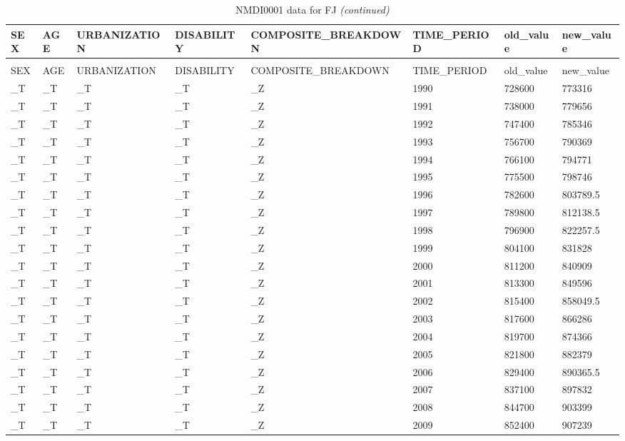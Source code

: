 
\begin{longtable}[t]{llllllll}
\caption{NMDI0001 data for FJ}\\
\toprule
SEX & AGE & URBANIZATION & DISABILITY & COMPOSITE\_BREAKDOWN & TIME\_PERIOD & old\_value & new\_value\\
\midrule
\endfirsthead
\caption[]{NMDI0001 data for FJ \textit{(continued)}}\\
\toprule
SEX & AGE & URBANIZATION & DISABILITY & COMPOSITE\_BREAKDOWN & TIME\_PERIOD & old\_value & new\_value\\
\midrule
\endhead

\endfoot
\bottomrule
\endlastfoot
\_T & \_T & \_T & \_T & \_Z & 1990 & 728600 & 773316\\
\_T & \_T & \_T & \_T & \_Z & 1991 & 738000 & 779656\\
\_T & \_T & \_T & \_T & \_Z & 1992 & 747400 & 785346\\
\_T & \_T & \_T & \_T & \_Z & 1993 & 756700 & 790369\\
\_T & \_T & \_T & \_T & \_Z & 1994 & 766100 & 794771\\
\addlinespace
\_T & \_T & \_T & \_T & \_Z & 1995 & 775500 & 798746\\
\_T & \_T & \_T & \_T & \_Z & 1996 & 782600 & 803789.5\\
\_T & \_T & \_T & \_T & \_Z & 1997 & 789800 & 812138.5\\
\_T & \_T & \_T & \_T & \_Z & 1998 & 796900 & 822257.5\\
\_T & \_T & \_T & \_T & \_Z & 1999 & 804100 & 831828\\
\addlinespace
\_T & \_T & \_T & \_T & \_Z & 2000 & 811200 & 840909\\
\_T & \_T & \_T & \_T & \_Z & 2001 & 813300 & 849596\\
\_T & \_T & \_T & \_T & \_Z & 2002 & 815400 & 858049.5\\
\_T & \_T & \_T & \_T & \_Z & 2003 & 817600 & 866286\\
\_T & \_T & \_T & \_T & \_Z & 2004 & 819700 & 874366\\
\addlinespace
\_T & \_T & \_T & \_T & \_Z & 2005 & 821800 & 882379\\
\_T & \_T & \_T & \_T & \_Z & 2006 & 829400 & 890365.5\\
\_T & \_T & \_T & \_T & \_Z & 2007 & 837100 & 897832\\
\_T & \_T & \_T & \_T & \_Z & 2008 & 844700 & 903399\\
\_T & \_T & \_T & \_T & \_Z & 2009 & 852400 & 907239\\

\end{longtable}
